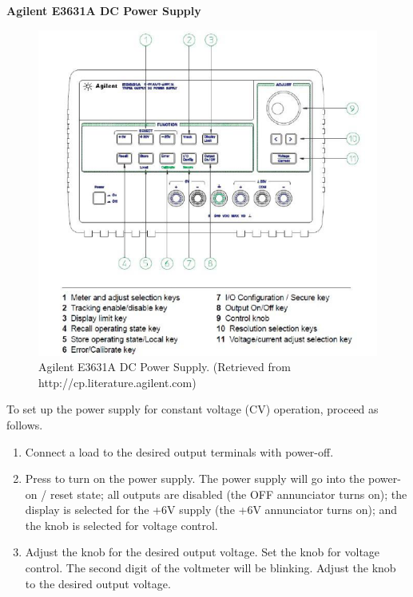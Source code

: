\documentclass{article}
\begin{document}
\vspace{10pt}
\indent \textbf{Agilent E3631A DC Power Supply} \\
\begin{figure}[H]\centering
\includegraphics[scale=0.3]{supply2.png}
\caption{Agilent E3631A DC Power Supply. (Retrieved from http://cp.literature.agilent.com)}
\end{figure}
To set up the power supply for constant voltage (CV) operation, proceed as follows.
\begin{enumerate}
\item Connect a load to the desired output terminals with power-off. 
\item Press to turn on the power supply. The power supply will go into the power-on / reset state; all outputs are disabled (the OFF annunciator turns on); the display is selected for the +6V supply (the +6V annunciator turns on); and the knob is selected for voltage control. 
\item Adjust the knob for the desired output voltage. Set the knob for voltage control. The second digit of the voltmeter will be blinking. Adjust the knob to the desired output voltage. 
\end{enumerate}
\end{document}
